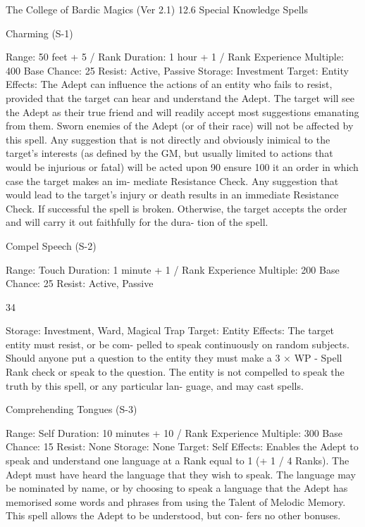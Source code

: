 \begin{Chapter}{The College of Bardic Magics (Ver 2.1)}
12.6 Special Knowledge Spells 

Charming (S-1) 

Range: 50 feet + 5 / Rank 
Duration: 1 hour + 1 / Rank 
Experience Multiple: 400 
Base Chance: 25%
Resist: Active, Passive 
Storage: Investment 
Target: Entity 
Effects: The  Adept can influence the actions of an 
entity  who  fails  to  resist,  provided  that  the  target 
can hear and understand the Adept. The target will 
see  the  Adept  as  their  true  friend  and  will  readily 
accept  most  suggestions  emanating  from  them. 
Sworn enemies of the Adept (or of their race) will 
not be affected by this spell. Any suggestion that is 
not  directly  and  obviously  inimical  to  the  target’s 
interests (as defined by the GM, but usually limited 
to  actions that  would  be  injurious  or  fatal)  will  be 
acted upon  90%
ensure 100%
it  an  order  in  which  case  the  target  makes  an  im-
mediate  Resistance  Check.  Any  suggestion  that 
would lead to the target’s injury or death results in 
an  immediate  Resistance  Check.  If  successful  the 
spell  is  broken.  Otherwise,  the  target  accepts  the 
order  and  will  carry  it  out  faithfully  for  the  dura-
tion of the spell. 

Compel Speech (S-2) 

Range: Touch 
Duration: 1 minute + 1 / Rank 
Experience Multiple: 200 
Base Chance: 25%
Resist: Active, Passive 

34 

Storage: Investment, Ward, Magical Trap 
Target: Entity 
Effects:  The  target  entity  must  resist,  or  be  com-
pelled  to  speak  continuously  on  random  subjects. 
Should  anyone  put  a  question  to  the  entity  they 
must make a 3 × WP  - Spell Rank check or speak 
to  the  question.  The  entity  is  not  compelled  to 
speak the truth by this spell, or any  particular lan-
guage, and may cast spells. 

Comprehending Tongues (S-3) 

Range: Self 
Duration: 10 minutes + 10 / Rank 
Experience Multiple: 300 
Base Chance: 15%
Resist: None 
Storage: None 
Target: Self 
Effects: Enables the Adept to speak and understand 
one language at a Rank equal to 1 (+ 1 / 4 Ranks). 
The Adept must have heard the language that they 
wish to speak. The language may be nominated by 
name, or by choosing to speak a language that the 
Adept  has  memorised  some  words  and  phrases 
from  using  the  Talent  of  Melodic  Memory.  This 
spell  allows  the  Adept  to  be  understood,  but  con-
fers no other bonuses. 


\end{Chapter}
